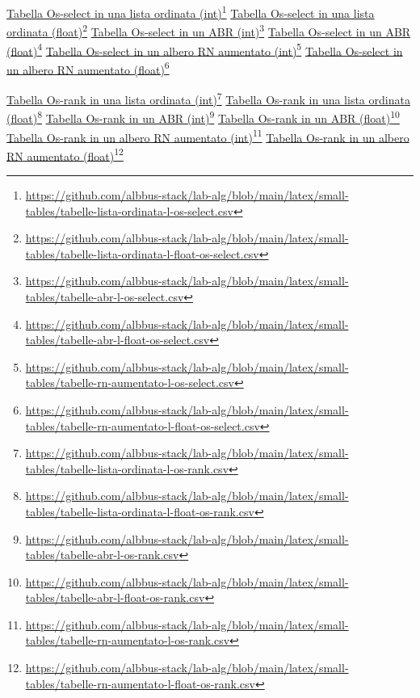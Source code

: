 \documentclass[onecolumn]{article}
\newcommand\anchor[2]{%
  \href{#2}{#1}\footnote{\url{#2}}%
}
\begin{document}
\newpage

\noindent
\anchor{Tabella Os-select in una lista ordinata (int)}{https://github.com/albbus-stack/lab-alg/blob/main/latex/small-tables/tabelle-lista-ordinata-l-os-select.csv} \label{label:lista-ordinata-l-os-select}
\newline
\anchor{Tabella Os-select in una lista ordinata (float)}{https://github.com/albbus-stack/lab-alg/blob/main/latex/small-tables/tabelle-lista-ordinata-l-float-os-select.csv} \label{label:lista-ordinata-l-float-os-select}
\newline
\anchor{Tabella Os-select in un ABR (int)}{https://github.com/albbus-stack/lab-alg/blob/main/latex/small-tables/tabelle-abr-l-os-select.csv} \label{label:abr-l-os-select}
\newline
\anchor{Tabella Os-select in un ABR (float)}{https://github.com/albbus-stack/lab-alg/blob/main/latex/small-tables/tabelle-abr-l-float-os-select.csv} \label{label:abr-l-float-os-select}
\newline
\anchor{Tabella Os-select in un albero RN aumentato (int)}{https://github.com/albbus-stack/lab-alg/blob/main/latex/small-tables/tabelle-rn-aumentato-l-os-select.csv} \label{label:rn-aumentato-l-os-select}
\newline
\anchor{Tabella Os-select in un albero RN aumentato (float)}{https://github.com/albbus-stack/lab-alg/blob/main/latex/small-tables/tabelle-rn-aumentato-l-float-os-select.csv} \label{label:rn-aumentato-l-float-os-select}

\newpage

\noindent
\anchor{Tabella Os-rank in una lista ordinata (int)}{https://github.com/albbus-stack/lab-alg/blob/main/latex/small-tables/tabelle-lista-ordinata-l-os-rank.csv} \label{label:lista-ordinata-l-os-rank}
\newline
\anchor{Tabella Os-rank in una lista ordinata (float)}{https://github.com/albbus-stack/lab-alg/blob/main/latex/small-tables/tabelle-lista-ordinata-l-float-os-rank.csv} \label{label:lista-ordinata-l-float-os-rank}
\newline
\anchor{Tabella Os-rank in un ABR (int)}{https://github.com/albbus-stack/lab-alg/blob/main/latex/small-tables/tabelle-abr-l-os-rank.csv} \label{label:abr-l-os-rank}
\newline
\anchor{Tabella Os-rank in un ABR (float)}{https://github.com/albbus-stack/lab-alg/blob/main/latex/small-tables/tabelle-abr-l-float-os-rank.csv} \label{label:abr-l-float-os-rank}
\newline
\anchor{Tabella Os-rank in un albero RN aumentato (int)}{https://github.com/albbus-stack/lab-alg/blob/main/latex/small-tables/tabelle-rn-aumentato-l-os-rank.csv} \label{label:rn-aumentato-l-os-rank}
\newline
\anchor{Tabella Os-rank in un albero RN aumentato (float)}{https://github.com/albbus-stack/lab-alg/blob/main/latex/small-tables/tabelle-rn-aumentato-l-float-os-rank.csv} \label{label:rn-aumentato-l-float-os-rank}
\end{document}
